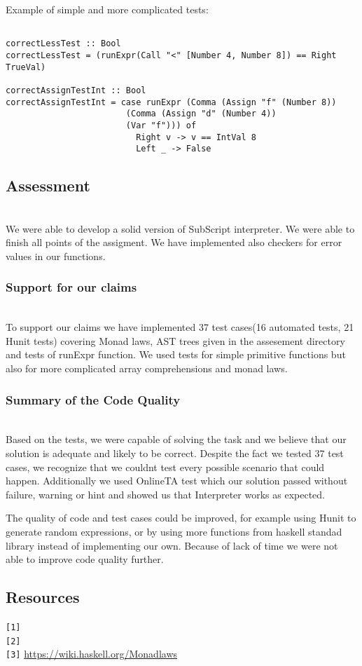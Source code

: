 \documentclass[11pt]{article}
\begin{document}
Example of simple and more complicated tests:
\begin{verbatim}

correctLessTest :: Bool
correctLessTest = (runExpr(Call "<" [Number 4, Number 8]) == Right TrueVal)	

correctAssignTestInt :: Bool
correctAssignTestInt = case runExpr (Comma (Assign "f" (Number 8))
                        (Comma (Assign "d" (Number 4))
                        (Var "f"))) of
                          Right v -> v == IntVal 8
                          Left _ -> False

\end{verbatim} 
\subsection{Assessment}\\
We were able to develop a solid version of SubScript interpreter. We were able to finish all points of the assigment. We have implemented also checkers for error values in our functions. 
\subsubsection{Support for our claims}\\
To support our claims we have implemented 37 test cases(16 automated tests, 21 Hunit tests) covering Monad laws, AST trees given in the assesement directory and tests of runExpr function. 
  We used tests for simple primitive functions but also for more complicated array comprehensions and monad laws. 

\subsubsection{Summary of the Code Quality} \\
Based on the tests, we were capable of solving the task and we believe that our solution is adequate and likely to be correct. Despite the fact we tested 37 test cases, we recognize that we couldnt test every possible scenario that could happen. Additionally we used OnlineTA test which our solution passed without failure, warning or hint and showed us that Interpreter works as expected.

The quality of code and test cases could be improved, for example using Hunit to generate random expressions, or by using more functions from haskell standad library instead of implementing our own. Because of lack of time we were not able to improve code quality further.

\subsection{Resources}
\texttt{[1]} \href{https://en.wikibooks.org/wiki/Haskell/Understanding\_monads/State}
\\
\texttt{[2]} \href{https://hkupty.github.io/2016/Understanding-the-math-behind-fp-monads/}
\\
\texttt{[3]} \href{}{https://wiki.haskell.org/Monad\textunderscore{}laws}
\end{document}
